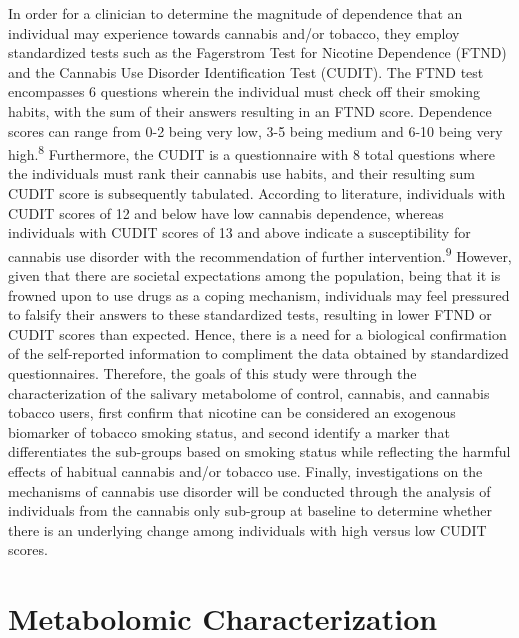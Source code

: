 \documentclass[journal=jacsat,manuscript=article]{achemso}
\begin{document}
In order for a clinician to determine the magnitude of dependence that
an individual may experience towards cannabis and/or tobacco, they
employ standardized tests such as the Fagerstrom Test for Nicotine
Dependence (FTND) and the Cannabis Use Disorder Identification Test
(CUDIT). The FTND test encompasses 6 questions wherein the individual
must check off their smoking habits, with the sum of their answers
resulting in an FTND score. Dependence scores can range from 0-2 being
very low, 3-5 being medium and 6-10 being very high.\textsuperscript{8}
Furthermore, the CUDIT is a questionnaire with 8 total questions where
the individuals must rank their cannabis use habits, and their resulting
sum CUDIT score is subsequently tabulated. According to literature,
individuals with CUDIT scores of 12 and below have low cannabis
dependence, whereas individuals with CUDIT scores of 13 and above
indicate a susceptibility for cannabis use disorder with the
recommendation of further intervention.\textsuperscript{9} However,
given that there are societal expectations among the population, being
that it is frowned upon to use drugs as a coping mechanism, individuals
may feel pressured to falsify their answers to these standardized tests,
resulting in lower FTND or CUDIT scores than expected. Hence, there is a
need for a biological confirmation of the self-reported information to
compliment the data obtained by standardized questionnaires. Therefore,
the goals of this study were through the characterization of the
salivary metabolome of control, cannabis, and cannabis tobacco users,
first confirm that nicotine can be considered an exogenous biomarker of
tobacco smoking status, and second identify a marker that differentiates
the sub-groups based on smoking status while reflecting the harmful
effects of habitual cannabis and/or tobacco use. Finally, investigations
on the mechanisms of cannabis use disorder will be conducted through the
analysis of individuals from the cannabis only sub-group at baseline to
determine whether there is an underlying change among individuals with
high versus low CUDIT scores.

\hypertarget{metabolomic-characterization}{%
\section{Metabolomic
Characterization}\label{metabolomic-characterization}}
\end{document}
